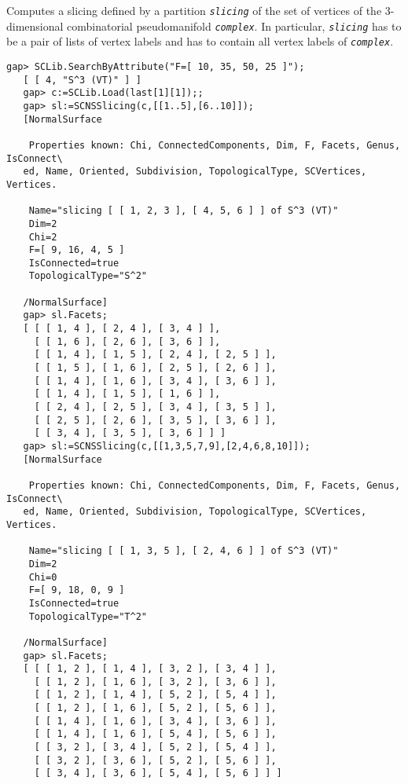 \documentclass[a4paper,11pt]{report}
\begin{document}
{{{ Computes a slicing defined by a partition \mbox{\texttt{\mdseries\slshape slicing}} of the set of vertices of the $3$-dimensional combinatorial pseudomanifold \mbox{\texttt{\mdseries\slshape complex}}. In particular, \mbox{\texttt{\mdseries\slshape slicing}} has to be a pair of lists of vertex labels and has to contain all vertex
labels of \mbox{\texttt{\mdseries\slshape complex}}. 
\begin{Verbatim}[commandchars=!@|,fontsize=\small,frame=single,label=Example]
   gap> SCLib.SearchByAttribute("F=[ 10, 35, 50, 25 ]");
   [ [ 4, "S^3 (VT)" ] ]
   gap> c:=SCLib.Load(last[1][1]);;                       
   gap> sl:=SCNSSlicing(c,[[1..5],[6..10]]);    
   [NormalSurface
   
    Properties known: Chi, ConnectedComponents, Dim, F, Facets, Genus, IsConnect\
   ed, Name, Oriented, Subdivision, TopologicalType, SCVertices, Vertices.
   
    Name="slicing [ [ 1, 2, 3 ], [ 4, 5, 6 ] ] of S^3 (VT)"
    Dim=2
    Chi=2
    F=[ 9, 16, 4, 5 ]
    IsConnected=true
    TopologicalType="S^2"
   
   /NormalSurface]
   gap> sl.Facets;
   [ [ [ 1, 4 ], [ 2, 4 ], [ 3, 4 ] ], 
     [ [ 1, 6 ], [ 2, 6 ], [ 3, 6 ] ], 
     [ [ 1, 4 ], [ 1, 5 ], [ 2, 4 ], [ 2, 5 ] ], 
     [ [ 1, 5 ], [ 1, 6 ], [ 2, 5 ], [ 2, 6 ] ], 
     [ [ 1, 4 ], [ 1, 6 ], [ 3, 4 ], [ 3, 6 ] ], 
     [ [ 1, 4 ], [ 1, 5 ], [ 1, 6 ] ], 
     [ [ 2, 4 ], [ 2, 5 ], [ 3, 4 ], [ 3, 5 ] ], 
     [ [ 2, 5 ], [ 2, 6 ], [ 3, 5 ], [ 3, 6 ] ], 
     [ [ 3, 4 ], [ 3, 5 ], [ 3, 6 ] ] ]
   gap> sl:=SCNSSlicing(c,[[1,3,5,7,9],[2,4,6,8,10]]);    
   [NormalSurface
   
    Properties known: Chi, ConnectedComponents, Dim, F, Facets, Genus, IsConnect\
   ed, Name, Oriented, Subdivision, TopologicalType, SCVertices, Vertices.
   
    Name="slicing [ [ 1, 3, 5 ], [ 2, 4, 6 ] ] of S^3 (VT)"
    Dim=2
    Chi=0
    F=[ 9, 18, 0, 9 ]
    IsConnected=true
    TopologicalType="T^2"
   
   /NormalSurface]
   gap> sl.Facets;                           
   [ [ [ 1, 2 ], [ 1, 4 ], [ 3, 2 ], [ 3, 4 ] ], 
     [ [ 1, 2 ], [ 1, 6 ], [ 3, 2 ], [ 3, 6 ] ], 
     [ [ 1, 2 ], [ 1, 4 ], [ 5, 2 ], [ 5, 4 ] ], 
     [ [ 1, 2 ], [ 1, 6 ], [ 5, 2 ], [ 5, 6 ] ], 
     [ [ 1, 4 ], [ 1, 6 ], [ 3, 4 ], [ 3, 6 ] ], 
     [ [ 1, 4 ], [ 1, 6 ], [ 5, 4 ], [ 5, 6 ] ], 
     [ [ 3, 2 ], [ 3, 4 ], [ 5, 2 ], [ 5, 4 ] ], 
     [ [ 3, 2 ], [ 3, 6 ], [ 5, 2 ], [ 5, 6 ] ], 
     [ [ 3, 4 ], [ 3, 6 ], [ 5, 4 ], [ 5, 6 ] ] ]
   

\end{Verbatim}}}}
\end{document}
